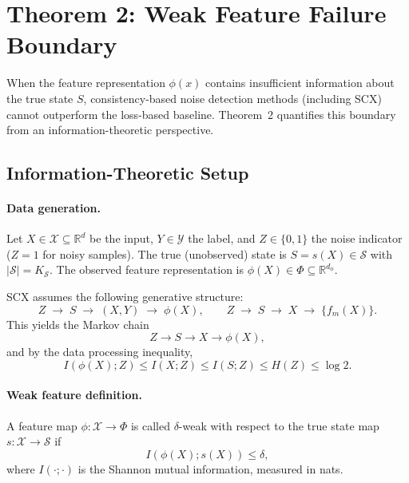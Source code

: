 
\section{Theorem 2: Weak Feature Failure Boundary}
\label{sec:thm2}

When the feature representation $\phi(x)$ contains insufficient information
about the true state $S$, consistency-based noise detection methods
(including SCX) cannot outperform the loss-based baseline. Theorem~2
quantifies this boundary from an information-theoretic perspective.

\subsection{Information-Theoretic Setup}
\label{sec:thm2:setup}

\paragraph{Data generation.}
Let $X \in \mathcal{X} \subseteq \mathbb{R}^d$ be the input, $Y \in \mathcal{Y}$
the label, and $Z \in \{0,1\}$ the noise indicator ($Z=1$ for noisy samples).
The true (unobserved) state is $S = s(X) \in \mathcal{S}$ with
$|\mathcal{S}| = K_{\mathcal{S}}$. The observed feature representation is
$\phi(X) \in \Phi \subseteq \mathbb{R}^{d_\phi}$.

SCX assumes the following generative structure:
\[
Z \;\to\; S \;\to\; (X, Y) \;\to\; \phi(X),
\qquad
Z \;\to\; S \;\to\; X \;\to\; \{f_m(X)\}.
\]
This yields the Markov chain
\begin{equation}
Z \to S \to X \to \phi(X),
\label{eq:markov-chain}
\end{equation}
and by the data processing inequality,
\[
I(\phi(X); Z) \leq I(X; Z) \leq I(S; Z) \leq H(Z) \leq \log 2.
\]

\paragraph{Weak feature definition.}

\begin{definition}
\label{def:weak-feature}
A feature map $\phi: \mathcal{X} \to \Phi$ is called $\delta$-weak with respect
to the true state map $s: \mathcal{X} \to \mathcal{S}$ if
\begin{equation}
I(\phi(X); s(X)) \leq \delta,
\label{eq:weak-feature}
\end{equation}
where $I(\cdot;\cdot)$ is the Shannon mutual information, measured in nats.
\end{definition}

